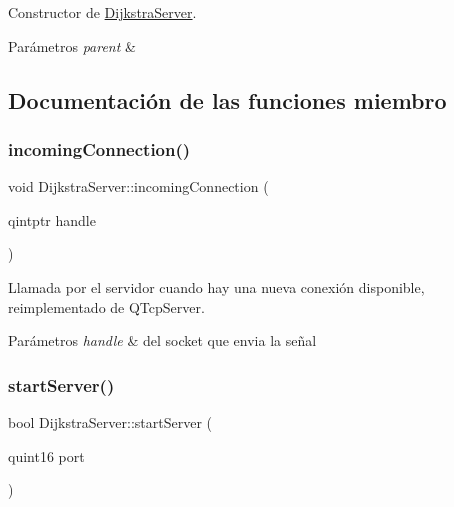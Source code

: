 Constructor de \hyperlink{class_dijkstra_server}{Dijkstra\+Server}. 


\begin{DoxyParams}{Parámetros}
{\em parent} & \\
\hline
\end{DoxyParams}


\subsection{Documentación de las funciones miembro}
\mbox{\label{class_dijkstra_server_aab86d4d415a39981088e75a140cfd6d4}} 
\subsubsection{\texorpdfstring{incoming\+Connection()}{incomingConnection()}}
{\footnotesize\ttfamily void Dijkstra\+Server\+::incoming\+Connection (\begin{DoxyParamCaption}\item[{qintptr}]{handle }\end{DoxyParamCaption})\hspace{0.3cm}{\ttfamily [protected]}}



Llamada por el servidor cuando hay una nueva conexión disponible, reimplementado de Q\+Tcp\+Server. 


\begin{DoxyParams}{Parámetros}
{\em handle} & del socket que envia la señal \\
\hline
\end{DoxyParams}
\mbox{\label{class_dijkstra_server_ad285a85f623398d6feffbfd138e4c76d}} 
\subsubsection{\texorpdfstring{start\+Server()}{startServer()}}
{\footnotesize\ttfamily bool Dijkstra\+Server\+::start\+Server (\begin{DoxyParamCaption}\item[{quint16}]{port }\end{DoxyParamCaption})}



